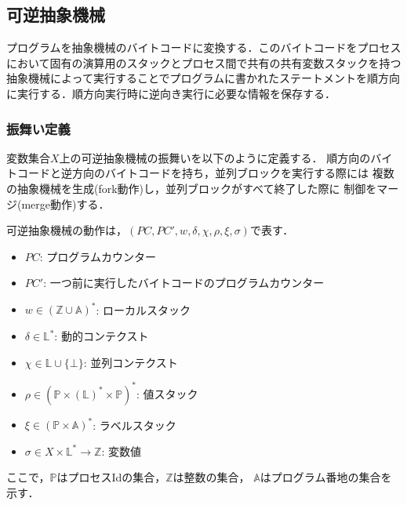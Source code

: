 \documentclass[submit,PRO]{ipsj}
\newtheorem{defn}[thm]{定義}
\begin{document}

\subsection{可逆抽象機械}
\label{sec:format}

プログラムを抽象機械のバイトコードに変換する．このバイトコードをプロセス
において固有の演算用のスタックとプロセス間で共有の共有変数スタックを持つ
抽象機械によって実行することでプログラムに書かれたステートメントを順方向
に実行する．順方向実行時に逆向き実行に必要な情報を保存する．

\subsubsection{振舞い定義}

変数集合$X$上の可逆抽象機械の振舞いを以下のように定義する．
順方向のバイトコードと逆方向のバイトコードを持ち，並列ブロックを実行する際には
複数の抽象機械を生成(fork動作)し，並列ブロックがすべて終了した際に
制御をマージ(merge動作)する．

可逆抽象機械の動作は，$(PC,PC',w,\delta,\chi,\rho,\xi,\sigma)$で表す．
\begin{itemize}
\item $PC$: プログラムカウンター
\item $PC'$: 一つ前に実行したバイトコードのプログラムカウンター
\item $w\in(\mathbb{Z}\cup\mathbb{A})^\ast$: ローカルスタック
\item $\delta\in\mathbb{L}^\ast$: 動的コンテクスト
\item $\chi\in \mathbb{L}\cup\{\bot\}$: 並列コンテクスト
\item $\rho\in(\mathbb{P}\times(\mathbb{L})^\ast\times\mathbb{P})^\ast$: 値スタック
\item $\xi\in(\mathbb{P}\times\mathbb{A})^\ast$: ラベルスタック
\item $\sigma\in X\times\mathbb{L}^\ast\rightarrow\mathbb{Z}$: 変数値
\end{itemize}
ここで，$\mathbb{P}$はプロセスIdの集合，$\mathbb{Z}$は整数の集合，
$\mathbb{A}$はプログラム番地の集合を示す．
\end{document}
